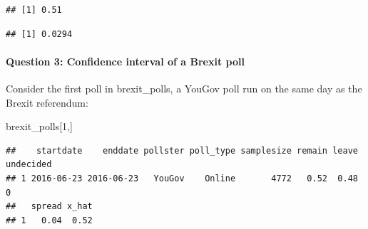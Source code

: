 \documentclass[
]{article}
\newenvironment{Shaded}{\begin{snugshade}}{\end{snugshade}}
\newcommand{\CommentTok}[1]{\textcolor[rgb]{0.56,0.35,0.01}{\textit{#1}}}
\newcommand{\DecValTok}[1]{\textcolor[rgb]{0.00,0.00,0.81}{#1}}
\newcommand{\KeywordTok}[1]{\textcolor[rgb]{0.13,0.29,0.53}{\textbf{#1}}}
\newcommand{\NormalTok}[1]{#1}
\newcommand{\OperatorTok}[1]{\textcolor[rgb]{0.81,0.36,0.00}{\textbf{#1}}}
\newcommand{\StringTok}[1]{\textcolor[rgb]{0.31,0.60,0.02}{#1}}
\begin{document}
\begin{verbatim}
## [1] 0.51
\end{verbatim}

\begin{Shaded}
\end{Shaded}

\begin{verbatim}
## [1] 0.0294
\end{verbatim}

\hypertarget{question-3-confidence-interval-of-a-brexit-poll}{%
\paragraph{Question 3: Confidence interval of a Brexit
poll}\label{question-3-confidence-interval-of-a-brexit-poll}}

Consider the first poll in brexit\_polls, a YouGov poll run on the same
day as the Brexit referendum:

\begin{Shaded}
\begin{Highlighting}[]
\NormalTok{brexit\_polls[}\DecValTok{1}\NormalTok{,]}
\end{Highlighting}
\end{Shaded}

\begin{verbatim}
##    startdate    enddate pollster poll_type samplesize remain leave undecided
## 1 2016-06-23 2016-06-23   YouGov    Online       4772   0.52  0.48         0
##   spread x_hat
## 1   0.04  0.52
\end{verbatim}

\begin{Shaded}
\end{Shaded}
\end{document}
